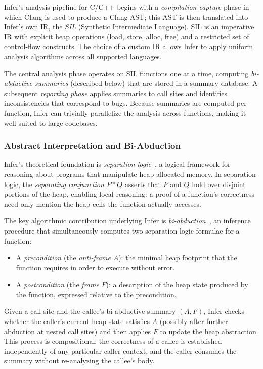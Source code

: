 \documentclass[11pt,a4paper]{article}
\begin{document}
Infer's analysis pipeline for C/C++ begins with a \emph{compilation capture} phase in which Clang is used to produce a Clang AST; this AST is then translated into Infer's own IR, the \emph{SIL} (Synthetic Intermediate Language). SIL is an imperative IR with explicit heap operations (load, store, alloc, free) and a restricted set of control-flow constructs. The choice of a custom IR allows Infer to apply uniform analysis algorithms across all supported languages.

The central analysis phase operates on SIL functions one at a time, computing \emph{bi-abductive summaries} (described below) that are stored in a summary database. A subsequent \emph{reporting phase} applies summaries to call sites and identifies inconsistencies that correspond to bugs. Because summaries are computed per-function, Infer can trivially parallelize the analysis across functions, making it well-suited to large codebases.

\subsubsection{Abstract Interpretation and Bi-Abduction}

Infer's theoretical foundation is \emph{separation logic}~\cite{reynolds2002}, a logical framework for reasoning about programs that manipulate heap-allocated memory. In separation logic, the \emph{separating conjunction} $P * Q$ asserts that $P$ and $Q$ hold over disjoint portions of the heap, enabling local reasoning: a proof of a function's correctness need only mention the heap cells the function actually accesses.

The key algorithmic contribution underlying Infer is \emph{bi-abduction}~\cite{calcagno2011}, an inference procedure that simultaneously computes two separation logic formulae for a function:

\begin{itemize}  
	\item A \emph{precondition} (the \emph{anti-frame} $A$): the minimal heap     footprint that the function requires in order to execute without error.  
	\item A \emph{postcondition} (the \emph{frame} $F$): a description of the     heap state produced by the function, expressed relative to the precondition. 
\end{itemize}
	      
Given a call site and the callee's bi-abductive summary $(A, F)$, Infer checks whether the caller's current heap state satisfies $A$ (possibly after further abduction at nested call sites) and then applies $F$ to update the heap abstraction. This process is compositional: the correctness of a callee is established independently of any particular caller context, and the caller consumes the summary without re-analyzing the callee's body.
	      
\end{document}
